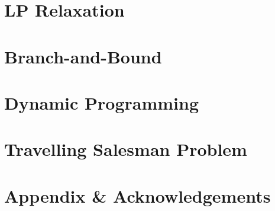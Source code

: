 \documentclass{article}
\begin{document}
\section{LP Relaxation}

\section{Branch-and-Bound}


\section{Dynamic Programming}

\section{Travelling Salesman Problem}

\newpage 

\section*{Appendix \& Acknowledgements}
\end{document}
